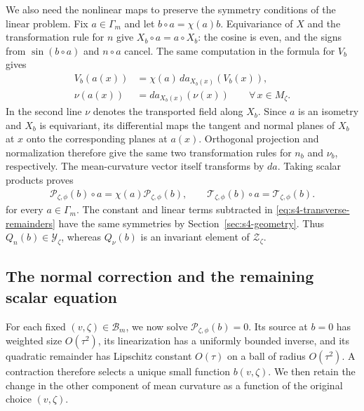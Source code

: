 \documentclass[a4paper,11pt,oneside,reqno]{amsart}
\numberwithin{equation}{section}
\theoremstyle{definition}
\begin{document}
We also need the nonlinear maps to preserve the symmetry
conditions of the linear problem. Fix $a\in\Gamma_m$ and
let $b\circ a=\chi(a)b$. Equivariance of $X$ and the
transformation rule for $n$ give
$X_b\circ a=a\circ X_b$: the cosine is even, and the
signs from $\sin(b\circ a)$ and $n\circ a$ cancel.
The same computation in the formula for $V_b$ gives
%
\begin{align*}
    V_b(a(x))
    &=\chi(a)\,d a_{X_b(x)}(V_b(x)),\\
    \nu(a(x))&=d a_{X_b(x)}(\nu(x))
    \qquad\forall\,x\in M_\zeta.
\end{align*}
%
In the second line $\nu$ denotes the transported field
along $X_b$. Since $a$ is an isometry and $X_b$ is
equivariant, its differential maps the tangent and normal
planes of $X_b$ at $x$ onto the corresponding planes at
$a(x)$. Orthogonal projection and normalization therefore
give the same two transformation rules for $n_b$ and
$\nu_b$, respectively. The mean-curvature vector itself
transforms by $d a$. Taking scalar products proves
%
\begin{align}
    \label{eq:s4-component-parities}
    \mathscr{P}_{\zeta,\phi}(b)\circ a
    =\chi(a)\mathscr{P}_{\zeta,\phi}(b),
    \qquad
    \mathscr{T}_{\zeta,\phi}(b)\circ a
    =\mathscr{T}_{\zeta,\phi}(b).
\end{align}
%
for every $a\in\Gamma_m$. The constant and linear terms
subtracted in \eqref{eq:s4-transverse-remainders} have the
same symmetries by Section~\ref{sec:s4-geometry}. Thus
$Q_n(b)\in\mathcal Y_\zeta$, whereas $Q_\nu(b)$ is an
invariant element of $\mathcal Z_\zeta$.

\subsection{The normal correction and the remaining scalar equation}

For each fixed $(v,\zeta)\in\mathcal B_m$, we now solve
$\mathscr P_{\zeta,\phi}(b)=0$. Its source at $b=0$ has
weighted size $O(\tau^2)$, its linearization has a uniformly
bounded inverse, and its quadratic remainder has Lipschitz
constant $O(\tau)$ on a ball of radius $O(\tau^2)$.
A contraction therefore selects a unique small function
$b(v,\zeta)$. We then retain the change in the other
component of mean curvature as a function of the original
choice $(v,\zeta)$.
\end{document}
